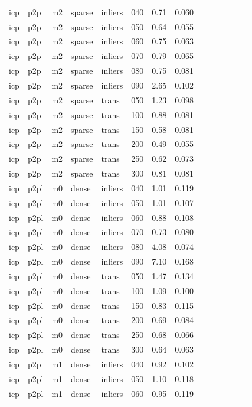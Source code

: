 \begin{table}[htbp]
\begin{tabular}{llllllrrrrrrrr}
  icp & p2p & m2 & sparse & inliers & 040 & 0.71 & 0.060 \\
  icp & p2p & m2 & sparse & inliers & 050 & 0.64 & 0.055 \\
  icp & p2p & m2 & sparse & inliers & 060 & 0.75 & 0.063 \\
  icp & p2p & m2 & sparse & inliers & 070 & 0.79 & 0.065 \\
  icp & p2p & m2 & sparse & inliers & 080 & 0.75 & 0.081 \\
  icp & p2p & m2 & sparse & inliers & 090 & 2.65 & 0.102 \\
  icp & p2p & m2 & sparse & trans & 050 & 1.23 & 0.098 \\
  icp & p2p & m2 & sparse & trans & 100 & 0.88 & 0.081 \\
  icp & p2p & m2 & sparse & trans & 150 & 0.58 & 0.081 \\
  icp & p2p & m2 & sparse & trans & 200 & 0.49 & 0.055 \\
  icp & p2p & m2 & sparse & trans & 250 & 0.62 & 0.073 \\
  icp & p2p & m2 & sparse & trans & 300 & 0.81 & 0.081 \\
  icp & p2pl & m0 & dense & inliers & 040 & 1.01 & 0.119 \\
  icp & p2pl & m0 & dense & inliers & 050 & 1.01 & 0.107 \\
  icp & p2pl & m0 & dense & inliers & 060 & 0.88 & 0.108 \\
  icp & p2pl & m0 & dense & inliers & 070 & 0.73 & 0.080 \\
  icp & p2pl & m0 & dense & inliers & 080 & 4.08 & 0.074 \\
  icp & p2pl & m0 & dense & inliers & 090 & 7.10 & 0.168 \\
  icp & p2pl & m0 & dense & trans & 050 & 1.47 & 0.134 \\
  icp & p2pl & m0 & dense & trans & 100 & 1.09 & 0.100 \\
  icp & p2pl & m0 & dense & trans & 150 & 0.83 & 0.115 \\
  icp & p2pl & m0 & dense & trans & 200 & 0.69 & 0.084 \\
  icp & p2pl & m0 & dense & trans & 250 & 0.68 & 0.066 \\
  icp & p2pl & m0 & dense & trans & 300 & 0.64 & 0.063 \\
  icp & p2pl & m1 & dense & inliers & 040 & 0.92 & 0.102 \\
  icp & p2pl & m1 & dense & inliers & 050 & 1.10 & 0.118 \\
  icp & p2pl & m1 & dense & inliers & 060 & 0.95 & 0.119 \\

\end{tabular}
\end{table}
